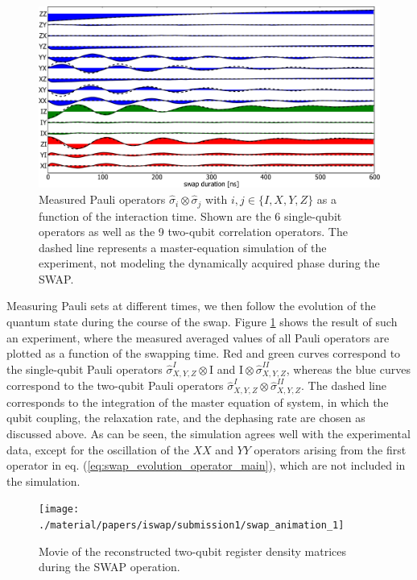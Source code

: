 \smallskip

\begin{figure}[ht!]
   \centering
	 \includegraphics[width=1.\textwidth]{"./data/ct5/film of swap/pauli_set_vs_time_with_simulation"}
	 \caption[]{Measured Pauli operators $\hat{\sigma}_i \otimes \hat{\sigma}_j$ with $i,j \in \{I,X,Y,Z\}$ as a function of the interaction time. Shown are the 6 single-qubit operators as well as the 9 two-qubit correlation operators. The dashed line represents a master-equation simulation of the experiment, not modeling the dynamically acquired phase during the SWAP.}
	 \label{fig:swap_pauli_set_vs_time_with_simulation}
\end{figure}

Measuring Pauli sets at different times, we then follow the evolution of the quantum state during the course of the swap. Figure \ref{fig:swap_pauli_set_vs_time_with_simulation} shows the result of such an experiment, where the measured averaged values of all Pauli operators are plotted as a function of the swapping time. Red and green curves correspond to the single-qubit Pauli operators $\hat{\sigma}^I_{X,Y,Z}\otimes \mathrm{I}$ and $\mathrm{I}\otimes \hat{\sigma}^{II}_{X,Y,Z}$, whereas the blue curves correspond to the two-qubit Pauli operators $\hat{\sigma}_{X,Y,Z}^I\otimes \hat{\sigma}_{X,Y,Z}^{II}$. The dashed line corresponds to the integration of the master equation of system, in which the qubit coupling, the relaxation rate, and the dephasing rate are chosen as discussed above. As can be seen, the simulation agrees well with the experimental data, except for the oscillation of the $XX$ and $YY$ operators arising from the first operator in eq. (\ref{eq:swap_evolution_operator_main}), which are not included in the simulation.

\smallskip

\begin{figure}[ht!]
  \ifanimate
	\else
	\texttt{[image: ./material/papers/iswap/submission1/swap\_animation\_1]}
	\fi
	\caption{Movie of the reconstructed two-qubit register density matrices during the SWAP operation.}
	\label{fig:RhoMovie}
\end{figure}

